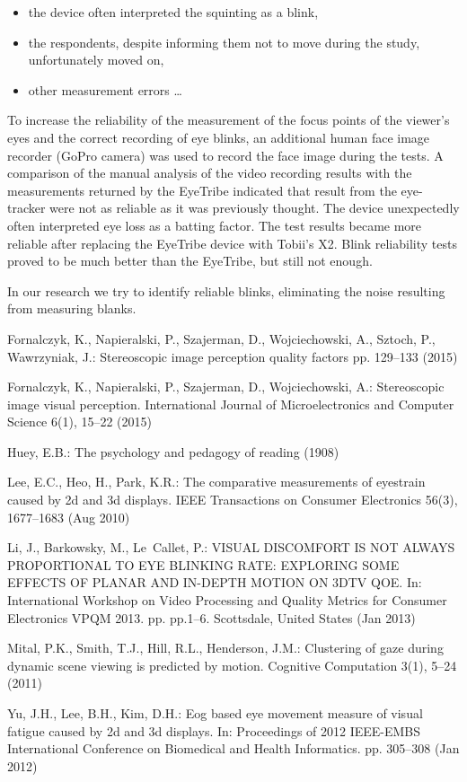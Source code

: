 \documentclass[conference]{IEEEtran}
\begin{document}
\begin{itemize}
	\item the device often interpreted the squinting as a blink,
	\item the respondents, despite informing them not to move during the study, unfortunately moved on,
	\item other measurement errors \ldots
\end{itemize}

To increase the reliability of the measurement of the focus points of the viewer's eyes and the correct recording of eye blinks, an additional human face image recorder (GoPro camera) was used to record the face image during the tests.
A comparison of the manual analysis of the video recording results with the measurements returned by the EyeTribe indicated that  result from the eye-tracker were not as reliable as it was previously thought. The device unexpectedly often interpreted eye loss as a batting factor. The test results became more reliable after replacing the EyeTribe device with Tobii's X2. Blink reliability tests proved to be much better than the EyeTribe, but still not enough.

In our research we try to identify reliable blinks, eliminating the noise resulting from measuring blanks.

\begin{thebibliography}{00}
Fornalczyk, K., Napieralski, P., Szajerman, D., Wojciechowski, A., Sztoch, P.,
Wawrzyniak, J.: Stereoscopic image perception quality factors pp. 129--133
(2015)

Fornalczyk, K., Napieralski, P., Szajerman, D., Wojciechowski, A.: Stereoscopic
image visual perception. International Journal of Microelectronics and
Computer Science  6(1),  15--22 (2015)

Huey, E.B.: The psychology and pedagogy of reading (1908)

Lee, E.C., Heo, H., Park, K.R.: The comparative measurements of eyestrain
caused by 2d and 3d displays. IEEE Transactions on Consumer Electronics
56(3),  1677--1683 (Aug 2010)

Li, J., Barkowsky, M., Le~Callet, P.: {VISUAL DISCOMFORT IS NOT ALWAYS
	PROPORTIONAL TO EYE BLINKING RATE: EXPLORING SOME EFFECTS OF PLANAR AND
	IN-DEPTH MOTION ON 3DTV QOE}. In: {International Workshop on Video Processing
	and Quality Metrics for Consumer Electronics VPQM 2013}. pp. pp.1--6.
Scottsdale, United States (Jan 2013)

Mital, P.K., Smith, T.J., Hill, R.L., Henderson, J.M.: Clustering of gaze
during dynamic scene viewing is predicted by motion. Cognitive Computation
3(1),  5--24 (2011)

Yu, J.H., Lee, B.H., Kim, D.H.: Eog based eye movement measure of visual
fatigue caused by 2d and 3d displays. In: Proceedings of 2012 IEEE-EMBS
International Conference on Biomedical and Health Informatics. pp. 305--308
(Jan 2012)

\end{thebibliography}
\end{document}
